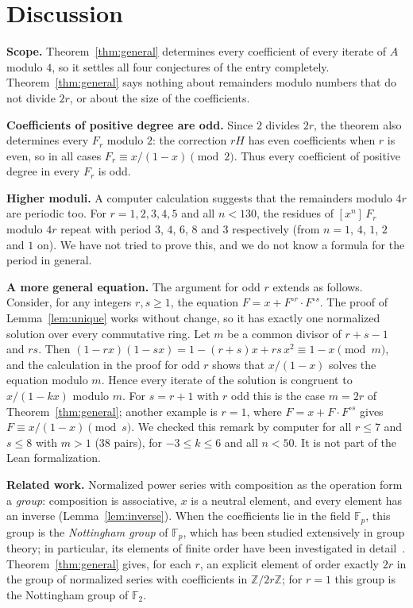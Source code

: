 \documentclass[11pt,a4paper]{article}
\theoremstyle{definition}
\theoremstyle{remark}
\newcommand{\Z}{\mathbb{Z}}
\newcommand{\F}{\mathbb{F}}
\newcommand{\coeff}[2]{[x^{#1}]\,#2}
\newcommand{\para}[1]{\par\medskip\noindent\textbf{#1}\enspace}
\begin{document}
\section{Discussion}\label{sec:discussion}

\para{Scope.} Theorem~\ref{thm:general} determines every coefficient of every iterate of $A$ modulo $4$, so it
settles all four conjectures of the entry completely. Theorem~\ref{thm:general} says nothing about remainders modulo numbers that do
not divide $2r$, or about the size of the coefficients.

\para{Coefficients of positive degree are odd.} Since $2$ divides $2r$, the theorem also determines every $F_r$ modulo $2$: the
correction $rH$ has even coefficients when $r$ is even, so in all cases $F_r\equiv x/(1-x)\pmod2$. Thus every
coefficient of positive degree in every $F_r$ is odd.

\para{Higher moduli.} A computer calculation suggests that the remainders modulo $4r$ are periodic too. For $r=1,2,3,4,5$
and all $n<130$, the residues of $\coeff{n}{F_r}$ modulo $4r$ repeat with period $3$, $4$, $6$, $8$ and $3$
respectively (from $n=1$, $4$, $1$, $2$ and $1$ on). We have not tried to prove this, and we do not know a formula for
the period in general.

\para{A more general equation.} The argument for odd $r$ extends as follows. Consider, for any integers $r,s\ge1$, the
equation $F=x+F^{\circ r}\cdot F^{\circ s}$. The proof of Lemma~\ref{lem:unique} works without change, so it has exactly
one normalized solution over every commutative ring. Let $m$ be a common divisor of $r+s-1$ and $rs$. Then
$(1-rx)(1-sx)=1-(r+s)x+rs\,x^2\equiv1-x\pmod m$, and the calculation in the proof for odd $r$ shows that
$x/(1-x)$ solves the equation modulo $m$. Hence every iterate of the solution is congruent to $x/(1-kx)$ modulo $m$.
For $s=r+1$ with $r$ odd this is the case $m=2r$ of Theorem~\ref{thm:general}; another example is $r=1$, where
$F=x+F\cdot F^{\circ s}$ gives $F\equiv x/(1-x)\pmod s$. We checked this remark by computer for all $r\le7$ and
$s\le8$ with $m>1$ ($38$ pairs), for $-3\le k\le6$ and all $n<50$. It is not part of the Lean formalization.

\para{Related work.} Normalized power series with composition as the operation form a \emph{group}: composition is
associative, $x$ is a neutral element, and every element has an inverse (Lemma~\ref{lem:inverse}). When the
coefficients lie in the field $\F_p$, this group is the \emph{Nottingham group} of $\F_p$, which has been studied
extensively in group theory; in particular, its elements of finite order have been investigated in
detail~\cite{camina}. Theorem~\ref{thm:general} gives, for each $r$, an explicit element of order exactly $2r$ in the
group of normalized series with coefficients in $\Z/2r\Z$; for $r=1$ this group is the Nottingham group of $\F_2$.
\end{document}
